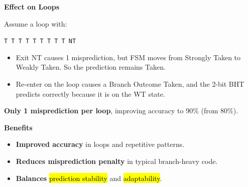 \newpage

\highspace
\begin{flushleft}
    \textcolor{Green3}{ \textbf{Effect on Loops}}
\end{flushleft}
Assume a loop with:
\begin{center}
    \texttt{T T T T T T T T T NT}
\end{center}
\begin{itemize}
    \item Exit NT causes 1 misprediction, but FSM moves from Strongly Taken to Weakly Taken. So the prediction remains Taken.
    \item Re-enter on the loop causes a Branch Outcome Taken, and the 2-bit BHT predicts correctly because it is on the WT state.
\end{itemize}
\textbf{Only 1 misprediction per loop}, improving accuracy to 90\% (from 80\%).

\highspace
\begin{flushleft}
    \textcolor{Green3}{ \textbf{Benefits}}
\end{flushleft}
\begin{itemize}
    \item \textbf{Improved accuracy} in loops and repetitive patterns.
    \item \textbf{Reduces misprediction penalty} in typical branch-heavy code.
    \item \textbf{Balances} \hl{prediction stability} and \hl{adaptability}.
\end{itemize}